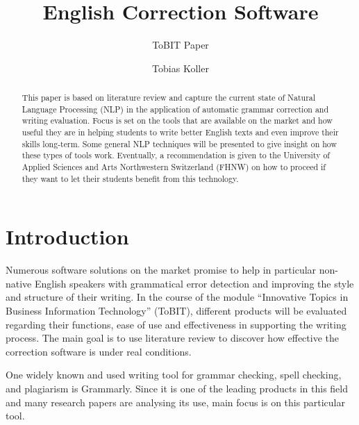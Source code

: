 \documentclass[runningheads]{llncs}
\let\OldTextregistered\textregistered
\renewcommand{\textregistered}{\OldTextregistered\xspace}
\begin{document}
\title{English Correction Software}
\subtitle{ToBIT Paper}

\author{Tobias Koller}



\maketitle              %


\begin{abstract}
This paper is based on literature review and capture the current state of Natural Language Processing (NLP) in the application of automatic grammar correction and writing evaluation. Focus is set on the tools that are available on the market and how useful they are in helping students to write better English texts and even improve their skills long-term. Some general NLP techniques will be presented to give insight on how these types of tools work. Eventually, a recommendation is given to the University of Applied Sciences and Arts Northwestern Switzerland (FHNW) on how to proceed if they want to let their students benefit from this technology.

\end{abstract}



\section{Introduction}
Numerous software solutions on the market promise to help in particular non-native English speakers with grammatical error detection and improving the style and structure of their writing. In the course of the module ``Innovative Topics in Business Information Technology'' (ToBIT), different products will be evaluated regarding their functions, ease of use and effectiveness in supporting the writing process. The main goal is to use literature review to discover how effective the correction software is under real conditions.

One widely known and used writing tool for grammar checking, spell checking, and plagiarism is Grammarly\textregistered. Since it is one of the leading products in this field and many research papers are analysing its use, main focus is on this particular tool.
\end{document}
